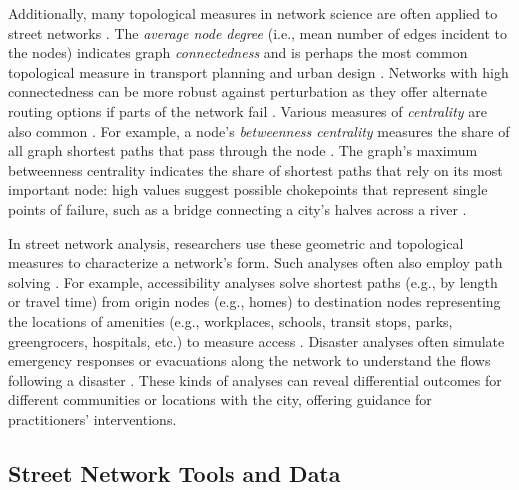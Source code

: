\documentclass[12pt,letterpaper]{article} %
\begin{document}
Additionally, many topological measures in network science are often applied to street networks \citep{barthelemy_spatial_2011}. The \textit{average node degree} (i.e., mean number of edges incident to the nodes) indicates graph \textit{connectedness} and is perhaps the most common topological measure in transport planning and urban design \citep[e.g.,][]{barrington-leigh_century_2015,barrington-leigh_more_2017,barrington-leigh_global_2020}. Networks with high connectedness can be more robust against perturbation as they offer alternate routing options if parts of the network fail \citep{boeing_resilient_2024}. Various measures of \textit{centrality} are also common \citep{crucitti_centrality_2006}. For example, a node's \textit{betweenness centrality} measures the share of all graph shortest paths that pass through the node \citep{barthelemy_betweenness_2004,barthelemy_self-organization_2013}. The graph's maximum betweenness centrality indicates the share of shortest paths that rely on its most important node: high values suggest possible chokepoints that represent single points of failure, such as a bridge connecting a city's halves across a river \citep{boeing_resilient_2024}.

In street network analysis, researchers use these geometric and topological measures to characterize a network's form. Such analyses often also employ path solving \citep{miller_measuring_1999,wang_road_2020}. For example, accessibility analyses solve shortest paths (e.g., by length or travel time) from origin nodes (e.g., homes) to destination nodes representing the locations of amenities (e.g., workplaces, schools, transit stops, parks, greengrocers, hospitals, etc.) to measure access \citep{foti_behavioral_2014,liu_generalized_2022}. Disaster analyses often simulate emergency responses or evacuations along the network to understand the flows following a disaster \citep{sasabe_road_2020,tamakloe_finding_2021}. These kinds of analyses can reveal differential outcomes for different communities or locations with the city, offering guidance for practitioners' interventions.

\subsection{Street Network Tools and Data}
\end{document}
